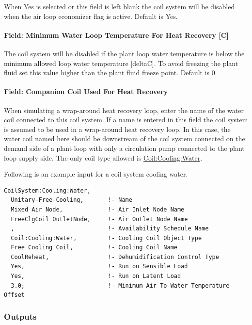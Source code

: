 When Yes is selected or this field is left blank the coil system will be disabled when the air loop economizer flag is active. Default is Yes.

\paragraph{Field: Minimum Water Loop Temperature For Heat Recovery [C]}\label{field-minimum-water-loop-temperature-for-heat-recovery}

The coil system will be disabled if the plant loop water temperature is below the minimum allowed loop water temperature [deltaC]. To avoid freezing the plant fluid set this value higher than the plant fluid freeze point. Default is 0.

\paragraph{Field: Companion Coil Used For Heat Recovery}\label{field-companion-coil-used-for-heat-recovery}

When simulating a wrap-around heat recovery loop, enter the name of the water coil connected to this coil system. If a name is entered in this field the coil system is assumed to be used in a wrap-around heat recovery loop. In this case, the water coil named here should be downstream of the coil system connected on the demand side of a plant loop with only a circulation pump connected to the plant loop supply side. The only coil type allowed is \hyperref[coilcoolingwater]{Coil:Cooling:Water}.


Following is an example input for a coil system cooling water.

\begin{lstlisting}
CoilSystem:Cooling:Water,
  Unitary-Free-Cooling,       !- Name
  Mixed Air Node,             !- Air Inlet Node Name
  FreeClgCoil OutletNode,     !- Air Outlet Node Name
  ,                           !- Availability Schedule Name
  Coil:Cooling:Water,         !- Cooling Coil Object Type
  Free Cooling Coil,          !- Cooling Coil Name
  CoolReheat,                 !- Dehumidification Control Type
  Yes,                        !- Run on Sensible Load
  Yes,                        !- Run on Latent Load
  3.0;                        !- Minimum Air To Water Temperature Offset
\end{lstlisting}


\subsubsection{Outputs}\label{outputs}


